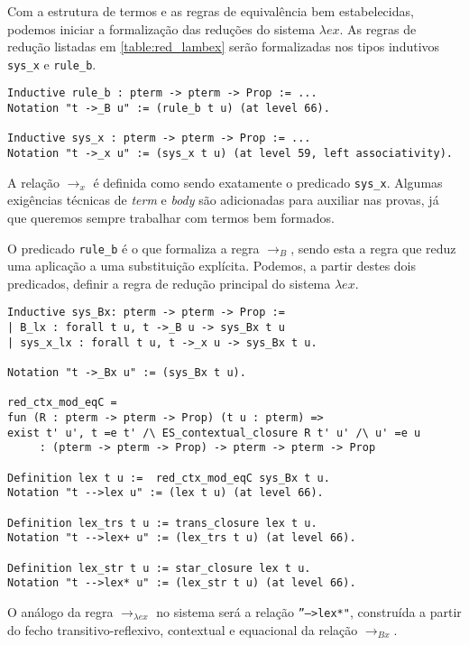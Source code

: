 Com a estrutura de termos e as regras de equivalência bem estabelecidas, podemos
iniciar a formalização das reduções do sistema $\lambda ex$.
As regras de redução listadas em  \ref{table:red_lambex} serão formalizadas nos
tipos indutivos \texttt{sys\_x} e \texttt{rule\_b}.

\begin{lstlisting}[basicstyle=\small]
Inductive rule_b : pterm -> pterm -> Prop := ...
Notation "t ->_B u" := (rule_b t u) (at level 66).

Inductive sys_x : pterm -> pterm -> Prop := ...
Notation "t ->_x u" := (sys_x t u) (at level 59, left associativity).
\end{lstlisting}

A relação $\rightarrow_x$ é definida como sendo exatamente o predicado
\texttt{sys\_x}. Algumas exigências técnicas de \emph{term} e \emph{body} são
adicionadas para auxiliar nas provas, já que queremos sempre trabalhar com
termos bem formados.

O predicado \texttt{rule\_b} é o que formaliza a regra $\rightarrow_B$, sendo
esta a regra que reduz uma aplicação a uma substituição explícita. Podemos, a
partir destes dois predicados, definir a regra de redução principal do sistema
$\lambda ex$.

\begin{lstlisting}[basicstyle=\small]
Inductive sys_Bx: pterm -> pterm -> Prop :=
| B_lx : forall t u, t ->_B u -> sys_Bx t u
| sys_x_lx : forall t u, t ->_x u -> sys_Bx t u.

Notation "t ->_Bx u" := (sys_Bx t u).

red_ctx_mod_eqC = 
fun (R : pterm -> pterm -> Prop) (t u : pterm) =>
exist t' u', t =e t' /\ ES_contextual_closure R t' u' /\ u' =e u
     : (pterm -> pterm -> Prop) -> pterm -> pterm -> Prop

Definition lex t u :=  red_ctx_mod_eqC sys_Bx t u.
Notation "t -->lex u" := (lex t u) (at level 66).

Definition lex_trs t u := trans_closure lex t u.
Notation "t -->lex+ u" := (lex_trs t u) (at level 66).

Definition lex_str t u := star_closure lex t u.
Notation "t -->lex* u" := (lex_str t u) (at level 66).
\end{lstlisting}

O análogo da regra $\rightarrow_{\lambda ex}$ no sistema será a relação
\texttt{''-->lex*"}, construída a partir do fecho transitivo-reflexivo,
contextual e equacional da relação $\rightarrow_{Bx}$.

